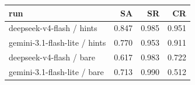 \begin{tabular}{lrrr}
\toprule
run & SA & SR & CR \\
\midrule
deepseek-v4-flash / hints & 0.847 & 0.985 & 0.951 \\
gemini-3.1-flash-lite / hints & 0.770 & 0.953 & 0.911 \\
deepseek-v4-flash / bare & 0.617 & 0.983 & 0.722 \\
gemini-3.1-flash-lite / bare & 0.713 & 0.990 & 0.512 \\
\bottomrule
\end{tabular}
